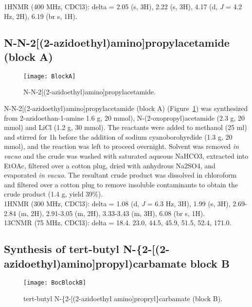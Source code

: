 \noindent
1HNMR (400 MHz, CDCl3): delta = 2.05 (s, 3H), 2.22 (s, 3H), 4.17 (d, {\it J} = 4.2 Hz, 2H), 6.19 (br s, 1H).

\clearpage

\subsection{N-N-2[(2-azidoethyl)amino]propylacetamide (block A)}

\begin{figure}
\centering
\texttt{[image: BlockA]}
\caption{N-N-2[(2-azidoethyl)amino]propylacetamide.}
\label{fig:BlockASynth}
\end{figure}

N-N-2[(2-azidoethyl)amino]propylacetamide (block A) (Figure~\ref{fig:BlockASynth}) was synthesized from 2-azidoethan-1-amine 1.6 g, 20 mmol), N-(2-oxopropyl)acetamide (2.3 g, 20 mmol) and LiCl (1.2 g, 30 mmol). The reactants were added to methanol (25 ml) and stirred for 1h before the addition of sodium cyanoborohyrdide (1.3 g, 20 mmol), and the reaction was left to proceed overnight. Solvent was removed {\it in vacuo} and the crude was washed with saturated aqueous NaHCO3, extracted into EtOAc, filtered over a cotton plug, dried with anhydrous Na2SO4, and evaporated {\it in vacuo}. The resultant crude product was dissolved in chloroform and filtered over a cotton plug to remove insoluble contaminants to obtain the crude product (1.4 g, yield 39{\%}). \\

\noindent
1HNMR (300 MHz, CDCl3): delta = 1.08 (d, {\it J} = 6.3 Hz, 3H), 1.99 (s, 3H), 2.69-2.84 (m, 2H), 2.91-3.05 (m, 2H), 3.33-3.43 (m, 3H), 6.08 (br s, 1H). \\

\noindent
13CNMR (75 MHz, CDCl3): delta = 18.4. 23.0, 44.5, 45.9, 51.5, 52.4, 171.0.\\

\clearpage

\subsection{Synthesis of tert-butyl N-\{2-[(2-azidoethyl)amino]propyl)carbamate block B}

\begin{figure}
\centering
\texttt{[image: BocBlockB]}
\caption{tert-butyl N-\{2-[(2-azidoethyl amino]propryl\}carbamate (block B).}
\label{fig:BocBlockBSynth}
\end{figure}

